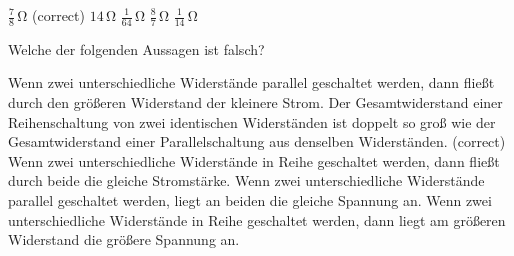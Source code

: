 \documentclass[11pt]{exam}
\begin{document}
\begin{questions}
\begin{choices}
	\choice \(\mathrm{\frac{7}{8}\,\Omega}\) (correct)
	\choice \(\mathrm{14\,\Omega}\)
	\choice \(\mathrm{\frac{1}{64}\,\Omega}\)
	\choice \(\mathrm{\frac{8}{7}\,\Omega}\)
	\choice \(\mathrm{\frac{1}{14}\,\Omega}\)
\end{choices}

\vspace{3mm}\question Welche der folgenden Aussagen ist falsch?

\begin{choices}
	\choice Wenn zwei unterschiedliche Widerstände parallel geschaltet werden, dann fließt durch den größeren Widerstand der kleinere Strom.
	\choice Der Gesamtwiderstand einer Reihenschaltung von zwei identischen Widerständen ist doppelt so groß wie der Gesamtwiderstand einer Parallelschaltung aus denselben Widerständen. (correct)
	\choice Wenn zwei unterschiedliche Widerstände in Reihe geschaltet werden, dann fließt durch beide die gleiche Stromstärke.
	\choice Wenn zwei unterschiedliche Widerstände parallel geschaltet werden, liegt an beiden die gleiche Spannung an.
	\choice Wenn zwei unterschiedliche Widerstände in Reihe geschaltet werden, dann liegt am größeren Widerstand die größere Spannung an.
\end{choices}

\vspace{3mm}\end{questions}
\end{document}
